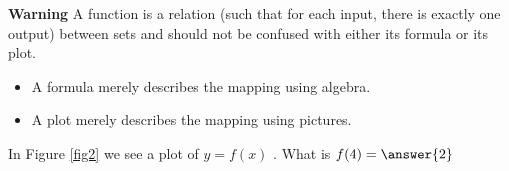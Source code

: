 \documentclass{ximera}
\theoremstyle{definition}
\begin{document}
\textbf{Warning} A function is a relation (such that for each input, there is exactly one output) between sets and should not be confused with either its formula or its plot.
\begin{itemize}
	\item A formula merely describes the mapping using algebra.
	\item A plot merely describes the mapping using pictures.
\end{itemize}
\begin{exercise}\label{exercise1}  
In Figure \ref{fig2} we see a plot of \(y = f ( x )\) . What is \(f(4) = \answer{2}\)  
\end{exercise}
\begin{figure*}
	\centering
		\caption{}
		\label{fig2}
\end{figure*}
\end{document}
